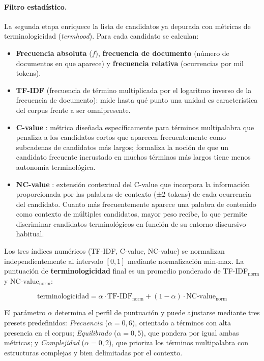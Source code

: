 \paragraph{Filtro estadístico.} La segunda etapa enriquece la lista de candidatos ya depurada con métricas de terminologicidad (\textit{termhood}). Para cada candidato se calculan:

\begin{itemize}
    \item \textbf{Frecuencia absoluta} ($f$), \textbf{frecuencia de documento} (número de documentos en que aparece) y \textbf{frecuencia relativa} (ocurrencias por mil tokens).
    \item \textbf{TF-IDF} (frecuencia de término multiplicada por el logaritmo inverso de la frecuencia de documento): mide hasta qué punto una unidad es característica del corpus frente a ser omnipresente.
    \item \textbf{C-value} \autocite{frantzi1999c}: métrica diseñada específicamente para términos multipalabra que penaliza a los candidatos cortos que aparecen frecuentemente como subcadenas de candidatos más largos; formaliza la noción de que un candidato frecuente incrustado en muchos términos más largos tiene menos autonomía terminológica.
    \item \textbf{NC-value} \autocite{frantzi2000automatic}: extensión contextual del C-value que incorpora la información proporcionada por las palabras de contexto (±2 tokens) de cada ocurrencia del candidato. Cuanto más frecuentemente aparece una palabra de contenido como contexto de múltiples candidatos, mayor peso recibe, lo que permite discriminar candidatos terminológicos en función de su entorno discursivo habitual.
\end{itemize}

Los tres índices numéricos (TF-IDF, C-value, NC-value) se normalizan independientemente al intervalo $[0,1]$ mediante normalización min-max. La puntuación de \textbf{terminologicidad} final es un promedio ponderado de TF-IDF$_{\text{norm}}$ y NC-value$_{\text{norm}}$:

\begin{equation}
\text{terminologicidad} = \alpha \cdot \text{TF-IDF}_{\text{norm}} + (1-\alpha) \cdot \text{NC-value}_{\text{norm}}
\label{eq:terminologicidad_tecla}
\end{equation}

El parámetro $\alpha$ determina el perfil de puntuación y puede ajustarse mediante tres presets predefinidos: \textit{Frecuencia} ($\alpha=0{,}6$), orientado a términos con alta presencia en el corpus; \textit{Equilibrado} ($\alpha=0{,}5$), que pondera por igual ambas métricas; y \textit{Complejidad} ($\alpha=0{,}2$), que prioriza los términos multipalabra con estructuras complejas y bien delimitadas por el contexto.

